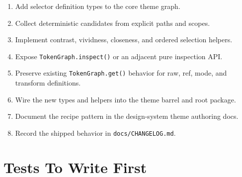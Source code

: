 \begin{enumerate}
\def\labelenumi{\arabic{enumi}.}
\tightlist
\item
  Add selector definition types to the core theme graph.
\item
  Collect deterministic candidates from explicit paths and scopes.
\item
  Implement contrast, vividness, closeness, and ordered selection helpers.
\item
  Expose \texttt{T\allowbreak{}o\allowbreak{}k\allowbreak{}e\allowbreak{}n\allowbreak{}G\allowbreak{}r\allowbreak{}a\allowbreak{}p\allowbreak{}h\allowbreak{}.\allowbreak{}i\allowbreak{}n\allowbreak{}s\allowbreak{}p\allowbreak{}e\allowbreak{}c\allowbreak{}t\allowbreak{}(\allowbreak{})} or an adjacent pure inspection API.
\item
  Preserve existing \texttt{T\allowbreak{}o\allowbreak{}k\allowbreak{}e\allowbreak{}n\allowbreak{}G\allowbreak{}r\allowbreak{}a\allowbreak{}p\allowbreak{}h\allowbreak{}.\allowbreak{}g\allowbreak{}e\allowbreak{}t\allowbreak{}(\allowbreak{})} behavior for raw, ref, mode, and transform definitions.
\item
  Wire the new types and helpers into the theme barrel and root package.
\item
  Document the recipe pattern in the design-system theme authoring docs.
\item
  Record the shipped behavior in \texttt{d\allowbreak{}o\allowbreak{}c\allowbreak{}s\allowbreak{}/\allowbreak{}C\allowbreak{}H\allowbreak{}A\allowbreak{}N\allowbreak{}G\allowbreak{}E\allowbreak{}L\allowbreak{}O\allowbreak{}G\allowbreak{}.\allowbreak{}m\allowbreak{}d}.
\end{enumerate}

\section{Tests To Write First}\label{record-184-tests-to-write-first}

